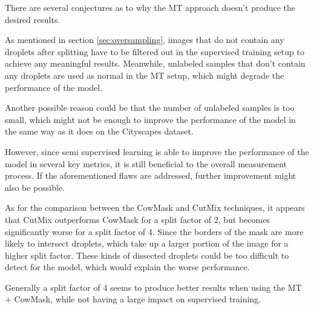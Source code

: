 There are several conjectures as to why the MT approach doesn't produce the desired results.

As mentioned in section \ref{sec:oversampling}, images that do not contain any droplets after splitting have to be filtered out in the supervised training setup to achieve any meaningful results.
Meanwhile, unlabeled samples that don't contain any droplets are used as normal in the MT setup, which might degrade the performance of the model.

Another possible reason could be that the number of unlabeled samples is too small, which might not be enough to improve the performance of the model in the same way as it does on the Cityscapes dataset.

However, since semi supervised learning is able to improve the performance of the model in several key metrics, it is still beneficial to the overall measurement process.
If the aforementioned flaws are addressed, further improvement might also be possible.

As for the comparison between the CowMask and CutMix techniques, it appears that CutMix outperforms CowMask for a split factor of 2, but becomes significantly worse for a split factor of 4.
Since the borders of the mask are more likely to intersect droplets, which take up a larger portion of the image for a higher split factor.
These kinds of dissected droplets could be too difficult to detect for the model, which would explain the worse performance. 

Generally a split factor of 4 seems to produce better results when using the MT + CowMask, while not having a large impact on supervised training.

